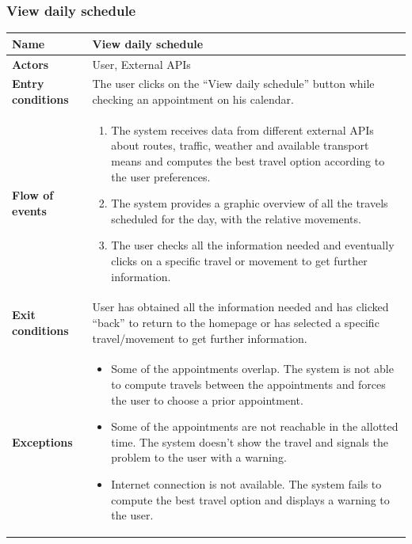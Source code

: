 \subsubsection{View daily schedule}
\begin{table}[!h]
	\centering
	{\renewcommand{\arraystretch}{2}%
		\begin{tabular}{|l|p{12cm}|}
			\hline
			\textbf{Name} 				& \textbf{View daily schedule} \\ \hline
			\textbf{Actors} 			& User, External APIs \\ \hline
			\textbf{Entry conditions} 	& The user clicks on the “View daily schedule” button while checking an appointment on his calendar. \\ \hline
			\textbf{Flow of events}		& \begin{minipage}[t]{0.75\textwidth}
				\begin{enumerate}
					\item The system receives data from different external APIs about routes, traffic, weather and available transport means and computes the best travel option according to the user preferences.
					\item The system provides a graphic overview of all the travels scheduled for the day, with the relative movements.
					\item The user checks all the information needed and eventually clicks on a specific travel or movement to get further information.
				\end{enumerate}
			\end{minipage}	\\ \hline
			\textbf{Exit conditions}	& User has obtained all the information needed and has clicked “back” to return to the homepage or has selected a specific travel/movement to get further information.  \\ \hline
			\textbf{Exceptions}			& \begin{minipage}[t]{0.75\textwidth}
				\begin{itemize}
					\item Some of the appointments overlap. The system is not able to compute travels between the appointments and forces the user to choose a prior appointment.
					\item Some of the appointments are not reachable in the allotted time. The system doesn’t show the travel and signals the problem to the user with a warning.
					\item Internet connection is not available. The system fails to compute the best travel option and displays a warning to the user.
				\end{itemize} 
			\end{minipage} \\ \hline
	\end{tabular}}
\end{table}
\clearpage


